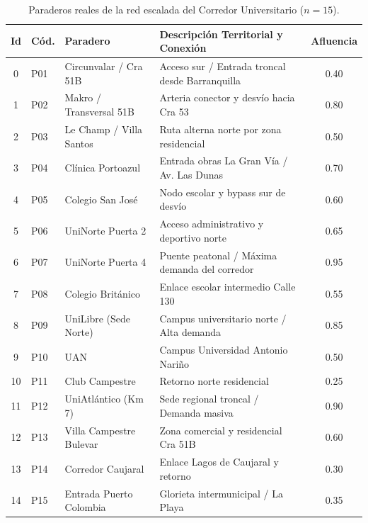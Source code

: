 \documentclass[11pt,letterpaper]{article}
\begin{document}
\begin{table}[H]
\centering
\small
\caption{Paraderos reales de la red escalada del Corredor Universitario ($n = 15$).}
\label{tab:paraderos_15}
\begin{tabular}{cllp{6.2cm}c}
\toprule
\textbf{Id} & \textbf{Cód.} & \textbf{Paradero} & \textbf{Descripción Territorial y Conexión} & \textbf{Afluencia} \\
\midrule
0  & P01 & Circunvalar / Cra 51B    & Acceso sur / Entrada troncal desde Barranquilla & 0.40 \\
1  & P02 & Makro / Transversal 51B  & Arteria conector y desvío hacia Cra 53          & 0.80 \\
2  & P03 & Le Champ / Villa Santos  & Ruta alterna norte por zona residencial        & 0.50 \\
3  & P04 & Clínica Portoazul        & Entrada obras La Gran Vía / Av. Las Dunas       & 0.70 \\
4  & P05 & Colegio San José         & Nodo escolar y bypass sur de desvío             & 0.60 \\
5  & P06 & UniNorte Puerta 2        & Acceso administrativo y deportivo norte         & 0.65 \\
6  & P07 & UniNorte Puerta 4        & Puente peatonal / Máxima demanda del corredor   & 0.95 \\
7  & P08 & Colegio Británico        & Enlace escolar intermedio Calle 130             & 0.55 \\
8  & P09 & UniLibre (Sede Norte)    & Campus universitario norte / Alta demanda       & 0.85 \\
9  & P10 & UAN                      & Campus Universidad Antonio Nariño               & 0.50 \\
10 & P11 & Club Campestre           & Retorno norte residencial                       & 0.25 \\
11 & P12 & UniAtlántico (Km 7)      & Sede regional troncal / Demanda masiva          & 0.90 \\
12 & P13 & Villa Campestre Bulevar  & Zona comercial y residencial Cra 51B            & 0.60 \\
13 & P14 & Corredor Caujaral        & Enlace Lagos de Caujaral y retorno              & 0.30 \\
14 & P15 & Entrada Puerto Colombia  & Glorieta intermunicipal / La Playa              & 0.35 \\
\bottomrule
\end{tabular}
\end{table}
\end{document}
